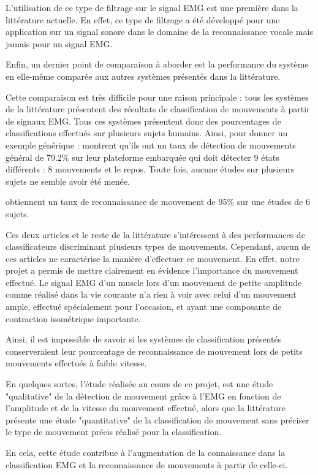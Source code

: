 \documentclass[letterpaper, twoside, 12pt, memoire, creativecommons, hyperref]{thETS}
\begin{document}
L'utilisation de ce type de filtrage sur le signal EMG est une première dans la littérature actuelle. En effet, ce type de filtrage a été développé pour une application sur un signal sonore dans le domaine de la reconnaissance vocale mais jamais pour un signal EMG.

Enfin, un dernier point de comparaison à aborder est la performance du système en elle-même comparée aux autres systèmes présentés dans la littérature. 

Cette comparaison est très difficile pour une raison principale : tous les systèmes de la littérature présentent des résultats de classification de mouvements à partir de signaux EMG. Tous ces systèmes présentent donc des pourcentages de classifications effectués sur plusieurs sujets humains. Ainsi, pour donner un exemple générique : \cite{Tenore2007} montrent qu'ils ont un taux de détection de mouvements général de 79.2\% sur leur plateforme embarquée qui doit détecter 9 états différents : 8 mouvements et le repos. Toute fois, aucune études sur plusieurs sujets ne semble avoir été menée. 

\cite{Chang1996} obtiennent un taux de reconnaissance de mouvement de 95\% sur une études de 6 sujets.

Ces deux articles et le reste de la littérature s'intéressent à des performances de classificateurs discriminant plusieurs types de mouvements. Cependant, aucun de ces articles ne caractérise la manière d'effectuer ce mouvement. En effet, notre projet a permis de mettre clairement en évidence l'importance du mouvement effectué. Le signal EMG d'un muscle lors d'un mouvement de petite amplitude comme réalisé dans la vie courante n'a rien à voir avec celui d'un mouvement ample, effectué spécialement pour l'occasion, et ayant une composante de contraction isométrique importante. 

Ainsi, il est impossible de savoir si les systèmes de classification présentés conserveraient leur pourcentage de reconnaissance de mouvement lors de petits mouvements effectués à faible vitesse.

En quelques sortes, l'étude réalisée au cours de ce projet, est une étude "qualitative" de la détection de mouvement grâce à l'EMG en fonction de l'amplitude et de la vitesse du mouvement effectué, alors que la littérature présente une étude "quantitative" de la classification de mouvement sans préciser le type de mouvement précis réalisé pour la classification. 

En cela, cette étude contribue à l'augmentation de la connaissance dans la classification EMG et la reconnaissance de mouvements à partir de celle-ci.
\end{document}
